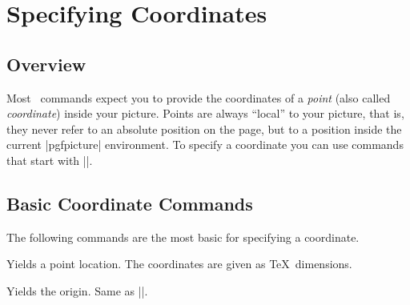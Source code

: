 %
%
%


\section{Specifying Coordinates}
\label{section-points}

\subsection{Overview}

Most \pgfname\ commands expect you to provide the coordinates of a \emph{point}
(also called \emph{coordinate}) inside your picture. Points are always
``local'' to your picture, that is, they never refer to an absolute position on
the page, but to a position inside the current |{pgfpicture}| environment. To
specify a coordinate you can use commands that start with |\pgfpoint|.


\subsection{Basic Coordinate Commands}

The following commands are the most basic for specifying a coordinate.

\begin{command}{\pgfpoint{}}
    Yields a point location. The coordinates are given as \TeX\ dimensions.
\begin{codeexample}[]
\end{codeexample}
\end{command}

\begin{command}{\pgfpointorigin}
    Yields the origin. Same as |\pgfpoint{0pt}{0pt}|.
\end{command}


